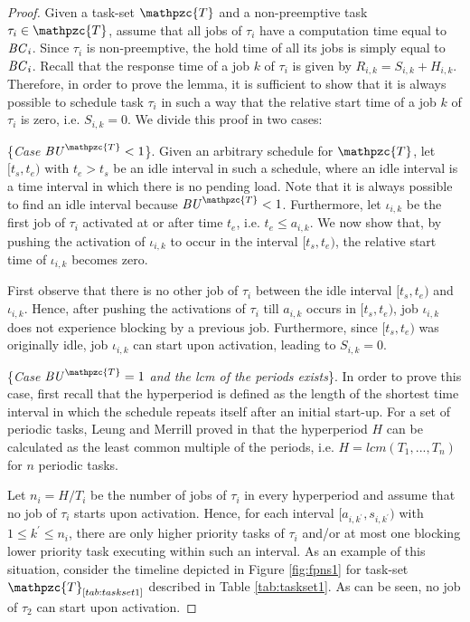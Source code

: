 \documentclass[conference,compsoc]{IEEEtran}
\newcommand{\bc}    {\mbox{\it BC}}
\newcommand{\bu}    {\mbox{\it BU}}
\begin{document}
\begin{proof}
	Given a task-set $\mathpzc{T}$ and a non-preemptive task $\tau_i \in \mathpzc{T}$, assume that all jobs of $\tau_i$ have a computation time equal to $\bc_i$. Since $\tau_i$ is non-preemptive, the hold time of all its jobs is simply equal to $\bc_i$. Recall that the response time of a job $k$ of $\tau_i$ is given by $R_{i,k}=S_{i,k}+H_{i,k}$. Therefore, in order to prove the lemma, it is sufficient to show that it is always possible to schedule task $\tau_i$ in such a way that the relative start time of a job $k$ of $\tau_i$ is zero, i.e. $S_{i,k}=0$. We divide this proof in two cases:
	
	\{\textit{Case $\bu^{\mathpzc{T}} < 1$}\}. Given an arbitrary schedule for $\mathpzc{T}$, let $[t_s,t_e)$ with $t_e > t_s$ be an idle interval in such a schedule, where an idle interval is a time interval in which there is no pending load. Note that it is always possible to find an idle interval because $\bu^{\mathpzc{T}} < 1$. Furthermore, let $\iota_{i,k}$  be the first job of $\tau_i$ activated at or after time $t_e$, i.e. $t_e \leq a_{i,k}$. We now show that, by pushing the activation of $\iota_{i,k}$ to occur in the interval $[t_s,t_e)$, the relative start time of $\iota_{i,k}$ becomes zero.
	
	First observe that there is no other job of $\tau_i$ between the idle interval $[t_s,t_e)$ and $\iota_{i,k}$. Hence, after pushing the activations of $\tau_i$ till $a_{i,k}$ occurs in $[t_s,t_e)$, job $\iota_{i,k}$ does not experience blocking by a previous job. Furthermore, since $[t_s,t_e)$ was originally idle, job $\iota_{i,k}$ can start upon activation, leading to $S_{i,k} = 0$.
	
	\{\textit{Case $\bu^{\mathpzc{T}} = 1$ and the lcm of the periods exists}\}. In
	order to prove this case, first recall that the hyperperiod is defined as the length of the shortest time interval in which the schedule repeats itself after an initial start-up. For a set of periodic tasks, Leung and Merrill proved in \cite{LM80} that the hyperperiod $H$ can be calculated as the least common multiple of the periods, i.e. $H=lcm(T_1,...,T_n)$ for $n$ periodic tasks. 
	
	Let $n_i = H/T_i$ be the number of jobs of $\tau_i$ in every hyperperiod and assume that no job of $\tau_i$ starts upon activation. Hence, for each interval $[a_{i,k^{\prime}},s_{i,k^{\prime}})$ with $1 \leq k^{\prime} \leq n_i$, there are only higher priority tasks of $\tau_i$ and/or at most one blocking lower priority task executing within such an interval. As an example of this situation, consider the timeline depicted in Figure \ref{fig:fpns1} for task-set $\mathpzc{T}_{\ref{tab:taskset1}}$ described in Table \ref{tab:taskset1}. As can be seen, no job of $\tau_2$ can start upon activation.
	

\end{proof}
\end{document}
